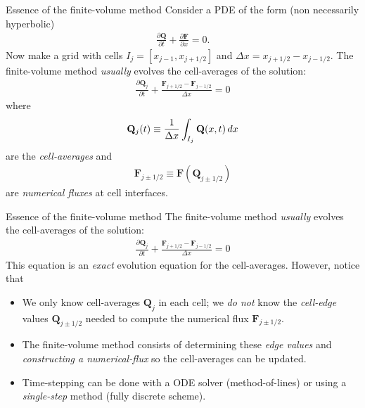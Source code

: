 \documentclass[aspectratio=169]{beamer}
\newcommand{\mypause}{}
\newcommand{\pfrac}[2]{\frac{\partial #1}{\partial #2}}
\newcommand{\mvec}[1]{\mathbf{#1}}
\begin{document}
\begin{frame}{Essence of the finite-volume method}
  \small%
  Consider a PDE of the form (non necessarily hyperbolic)
  \begin{align*}
    \pfrac{\mvec{Q}}{t} + \pfrac{\mvec{F}}{x} = 0.    
  \end{align*}
  Now make a grid with cells $I_j = [x_{j-1},x_{j+1/2}]$ and
  $\Delta x = x_{j+1/2} - x_{j-1/2}$. The finite-volume method
  \emph{usually} evolves the cell-averages of the solution:
  \begin{align*}
    \pfrac{\mvec{Q}_j}{t} + \frac{\mvec{F}_{j+1/2} -\mvec{F}_{j-1/2} }{\Delta x} = 0
  \end{align*}
  where
  \begin{align*}
    \mvec{Q}_j(t) \equiv \frac{1}{\Delta x}\int_{I_j} \mvec{Q}(x,t) \thinspace dx
  \end{align*}
  are the \emph{cell-averages} and
  \begin{align*}
    \mvec{F}_{j\pm 1/2} \equiv \mvec{F}(\mvec{Q}_{j\pm 1/2})
  \end{align*}
  are \emph{numerical fluxes} at cell interfaces.

\end{frame}

\begin{frame}{Essence of the finite-volume method}
  \small%
  The finite-volume method \emph{usually} evolves the cell-averages of
  the solution:
  \begin{align*}
    \pfrac{\mvec{Q}_j}{t} + \frac{\mvec{F}_{j+1/2} -\mvec{F}_{j-1/2} }{\Delta x} = 0
  \end{align*}
  This equation is an \emph{exact} evolution equation for the
  cell-averages.\mypause%
  However, notice that
  \begin{itemize}
  \item We only know cell-averages $\mvec{Q}_{j}$ in each cell; we
    \emph{do not} know the \emph{cell-edge} values
    $\mvec{Q}_{j\pm 1/2}$ needed to compute the numerical flux
    $\mvec{F}_{j\pm 1/2}$.%
    \mypause%
  \item The finite-volume method consists of determining these
    \emph{edge values} and \emph{constructing a numerical-flux} so the
    cell-averages can be updated.
  \item Time-stepping can be done with a ODE solver (method-of-lines)
    or using a \emph{single-step} method (fully discrete scheme).
  \end{itemize}
  
\end{frame}
\end{document}
